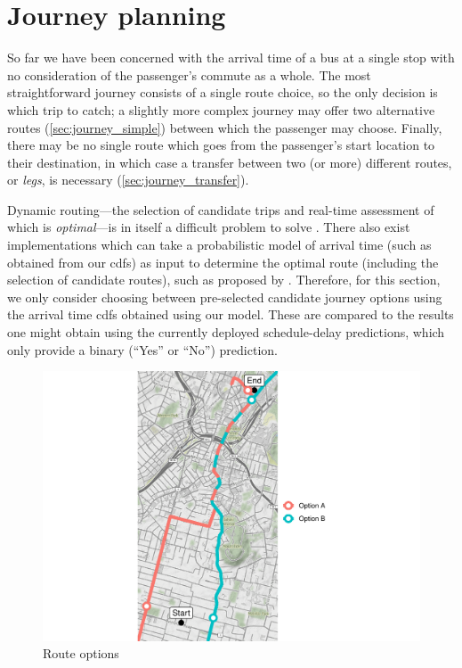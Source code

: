 \section{Journey planning}
\label{sec:etas-journey-planning}



So far we have been concerned with the arrival time of a bus at a single stop with no consideration of the passenger's commute as a whole. The most straightforward journey consists of a single route choice, so the only decision is which trip to catch; a slightly more complex journey may offer two alternative routes (\cref{sec:journey_simple}) between which the passenger may choose. Finally, there may be no single route which goes from the passenger's start location to their destination, in which case a transfer between two (or more) different routes, or \emph{legs}, is necessary (\cref{sec:journey_transfer}).


Dynamic routing---the selection of candidate trips and real-time assessment of which is \emph{optimal}---is in itself a difficult problem to solve \citep{Hame_2013a,Hame_2013b,Zheng_2016}. There also exist implementations which can take a probabilistic model of arrival time (such as obtained from our \glspl{cdf}) as input to determine the optimal route (including the selection of candidate routes), such as proposed by \citet{Berczi_2017}. Therefore, for this section, we only consider choosing between pre-selected candidate journey options using the arrival time \glspl{cdf} obtained using our \pf{} model. These are compared to the results one might obtain using the currently deployed schedule-delay predictions, which only provide a binary (``Yes'' or ``No'') prediction.


\begin{knitrout}\small
{}\color{fgcolor}\begin{figure}

{\centering \includegraphics[width=\textwidth]{figure/eta_journey_arrival_prep-1} 

}

\caption[Route options]{Route options}\label{fig:eta_journey_arrival_prep}
\end{figure}


\end{knitrout}

